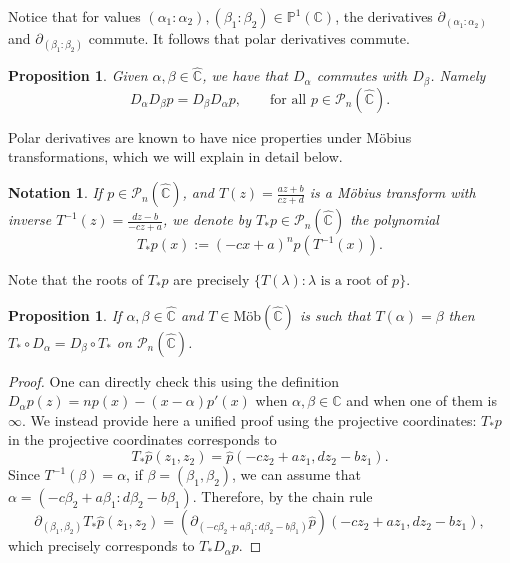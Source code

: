 \documentclass[reqno,11pt]{amsart}
\newtheorem{proposition}[theorem]{Proposition}
\newtheorem{notation}[theorem]{Notation}
\theoremstyle{remark}
\newcommand{\cc}{\mathbb{C}}
\newcommand{\PP}{\mathcal{P}}
\newcommand{\polar}[1]{D_{#1}}
\newcommand{\mobc}{\text{Möb}(\hat{\cc})}
\newcommand{\pol}{\mathcal{P}}
\begin{document}
Notice that for values $ (\alpha_1:\alpha_2),(\beta_1:\beta_2)\in \mathbb{P}^1(\cc) $, the derivatives $ \partial_{ (\alpha_1:\alpha_2)} $ and $ \partial_{ (\beta_1:\beta_2)} $ commute. It follows that polar derivatives commute.

\begin{proposition}
Given $\alpha,\beta\in \hat{\cc}$, we have that $ \polar{\alpha} $ commutes with $ \polar{\beta} $. Namely
    $$ \polar{\alpha}\polar{\beta}p = \polar{\beta}\polar{\alpha}p,\qquad \text{for all }p\in \pol_n(\hat{\cc}).$$
\end{proposition}




Polar derivatives are known to have nice properties under Möbius transformations, which we will explain in detail below.
\begin{notation}
If $p\in \PP_n(\hat{\cc})$, and $ T(z) = \frac{az+b}{cz+d} $ is a Möbius transform with inverse $ T^{-1}(z) = \frac{dz-b}{-cz+a} $, we denote by $T_*p\in \PP_n(\hat{\cc})$ the polynomial 
\begin{equation}
T_*p(x):=(-cx+a)^n p(T^{-1}(x)). 
\end{equation}
\end{notation}
Note that the roots of $T_*p$ are precisely $\{T(\lambda) : \lambda \text{ is a root of }p\}$.


\begin{proposition}\label{prop:FintertwinedbyMobius}
If $\alpha,\beta\in \hat{\cc}$ and $T\in\mobc$ is such that $T(\alpha)=\beta$ then $T_*\circ \polar{\alpha} = \polar{\beta}\circ T_*$ on $ \PP_n(\hat{\cc})$.
\end{proposition}

\begin{proof}
One can directly check this using the definition $ \polar{\alpha}p(z)=np(x) - (x-\alpha)p'(x) $ when $\alpha,\beta\in \cc$ and when one of them is $\infty$. We instead provide here a unified proof using the projective coordinates: $ T_*p $ in the projective coordinates corresponds to
$$ T_*\hat{p}(z_1,z_2) = \hat{p}( -cz_2+az_1,dz_2-bz_1 ). $$
Since $T^{-1}(\beta)=\alpha $, if $ \beta=(\beta_1,\beta_2) $, we can assume that $ \alpha=( -c\beta_2+a\beta_1:d\beta_2-b\beta_1 ) $. Therefore, by the chain rule
$$ \partial_{(\beta_1,\beta_2)}T_*\hat{p}(z_1,z_2) = \left(\partial_{ (-c\beta_2+a\beta_1:d\beta_2-b\beta_1 ) }\hat{p}\right)( -cz_2+az_1,dz_2-bz_1 ), $$
which precisely corresponds to $ T_*\polar{\alpha}p $.
\end{proof}
\end{document}

